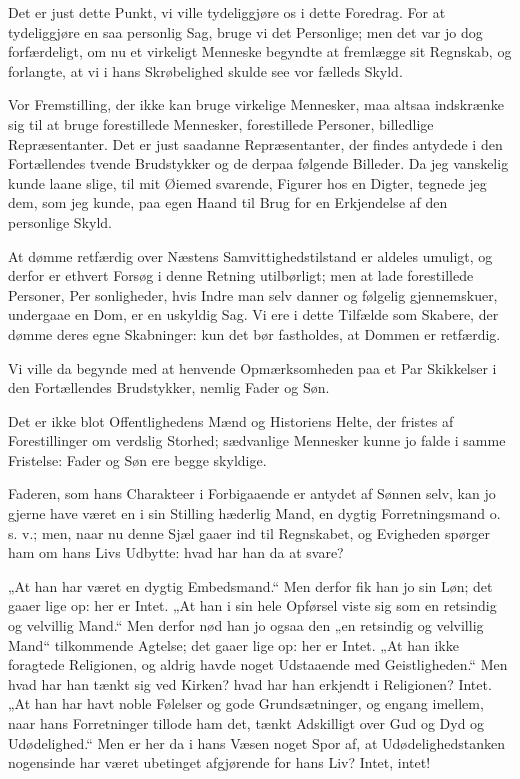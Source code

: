 \documentclass[12pt,a4paper]{book}
\newcommand{\apage}[1]{\marginnote{\footnotesize\textit{[#1]}}}
\begin{document}
Det er just dette Punkt, vi ville tydeliggjøre os i dette Foredrag. For
at tydeliggjøre en saa personlig Sag, bruge vi det Personlige; men det
var jo dog forfærdeligt, om nu et virkeligt Menneske begyndte at
fremlægge sit Regnskab, og forlangte, at vi i hans Skrøbelighed skulde
see vor fælleds Skyld.

Vor Fremstilling, der ikke kan bruge virkelige Mennesker, maa altsaa
indskrænke sig til at bruge forestillede Mennesker, forestillede
Personer, billedlige Repræsentanter. Det er just saadanne Repræsentanter,
der findes antydede i den Fortællendes tvende Brudstykker og de derpaa
følgende Billeder. Da jeg vanskelig kunde laane slige, til mit Øiemed
svarende, Figurer hos en Digter, tegnede jeg dem, som jeg kunde, paa egen
Haand til Brug for en Erkjendelse af den personlige Skyld.

At dømme retfærdig over Næstens Samvittighedstilstand er aldeles
umuligt, og derfor er ethvert Forsøg i denne Retning utilbørligt; men at
lade forestillede Personer,
Per \apage{97}sonligheder, hvis Indre man selv danner og følgelig gjennemskuer,
undergaae en Dom, er en uskyldig Sag. Vi ere i dette Tilfælde som
Skabere, der dømme deres egne Skabninger: kun det bør fastholdes, at
Dommen er retfærdig.

Vi ville da begynde med at henvende Opmærksomheden paa et Par Skikkelser
i den Fortællendes Brudstykker, nemlig Fader og Søn.

Det er ikke blot Offentlighedens Mænd og Historiens Helte, der fristes af
Forestillinger om verdslig Storhed; sædvanlige Mennesker kunne jo falde i
samme Fristelse: Fader og Søn ere begge skyldige.

Faderen, som hans Charakteer i Forbigaaende er antydet af Sønnen selv,
kan jo gjerne have været en i sin Stilling hæderlig Mand, en dygtig
Forretningsmand o. s. v.; men, naar nu denne Sjæl gaaer ind til
Regnskabet, og Evigheden spørger ham om hans Livs Udbytte: hvad har han
da at svare?

„At han har været en dygtig Embedsmand.“ Men derfor fik han jo sin Løn;
det gaaer lige op: her er Intet. „At han i sin hele Opførsel viste sig
som en retsindig og velvillig Mand.“ Men derfor nød han jo ogsaa den „en
retsindig og velvillig Mand“ tilkommende Agtelse; det gaaer lige op: her
er Intet. „At han ikke foragtede Religionen, og aldrig havde noget
Udstaaende med Geistligheden.“ Men hvad har han tænkt sig ved Kirken?
hvad har han erkjendt i Religionen? Intet. „At han har havt noble
Følelser og gode Grundsætninger, og engang imellem, naar hans
Forretninger tillode ham det, tænkt Adskilligt over Gud og Dyd og
Udødelighed.“ Men er her da i hans Væsen noget Spor af, at
Udødelighedstanken nogensinde har været ubetinget afgjørende for hans
Liv? Intet, intet!
\end{document}
